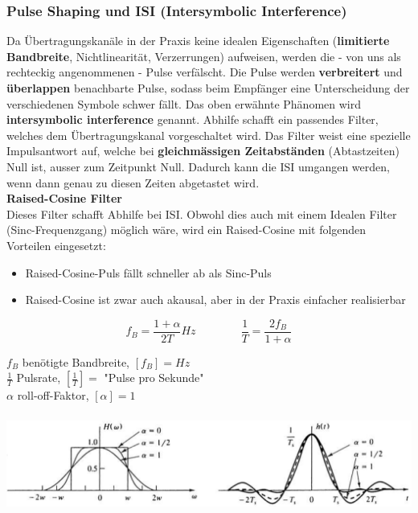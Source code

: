 \subsubsection{Pulse Shaping und ISI (Intersymbolic Interference)}
Da Übertragungskanäle in der Praxis keine idealen Eigenschaften 
(\textbf{limitierte Bandbreite}, Nichtlinearität, Verzerrungen) aufweisen,
werden die - von uns als rechteckig
angenommenen - Pulse verfälscht. Die Pulse werden \textbf{verbreitert} und \textbf{überlappen}
benachbarte Pulse, sodass beim Empfänger eine Unterscheidung der verschiedenen Symbole schwer
fällt. 
Das oben erwähnte Phänomen wird \textbf{intersymbolic interference} genannt.
Abhilfe schafft ein passendes Filter, welches dem Übertragungskanal vorgeschaltet wird. Das Filter
weist eine spezielle Impulsantwort auf, welche bei \textbf{gleichmässigen Zeitabständen}
(Abtastzeiten) Null ist, ausser zum Zeitpunkt Null. Dadurch kann die ISI umgangen werden, wenn dann
genau zu diesen Zeiten abgetastet wird. \\ 

\textbf{Raised-Cosine Filter} \\
Dieses Filter schafft Abhilfe bei ISI. Obwohl dies auch mit einem Idealen Filter
(Sinc-Frequenzgang) möglich wäre, wird ein Raised-Cosine mit folgenden Vorteilen eingesetzt:
\begin{itemize}
  \item Raised-Cosine-Puls fällt schneller ab als Sinc-Puls
  \item Raised-Cosine ist zwar auch akausal, aber in der Praxis einfacher realisierbar 
\end{itemize}

\begin{minipage}{9cm}
$$ f_B = \frac{1 + \alpha}{2 T} Hz \qquad \qquad \frac{1}{T} = \frac{2 f_B}{1 + \alpha}$$
\end{minipage}
\begin{minipage}{9cm}
	$f_B$ benötigte Bandbreite, $[f_B] = Hz$ \\
	$\frac{1}{T}$ Pulsrate, $[\frac{1}{T}] = $ "Pulse pro Sekunde" \\
	$\alpha$ roll-off-Faktor, $[\alpha] = 1$ 
\end{minipage}

\begin{center}  
		\includegraphics[height=3.2cm]{bilder/dig_raisedcosinefilter.png}
\end{center}


